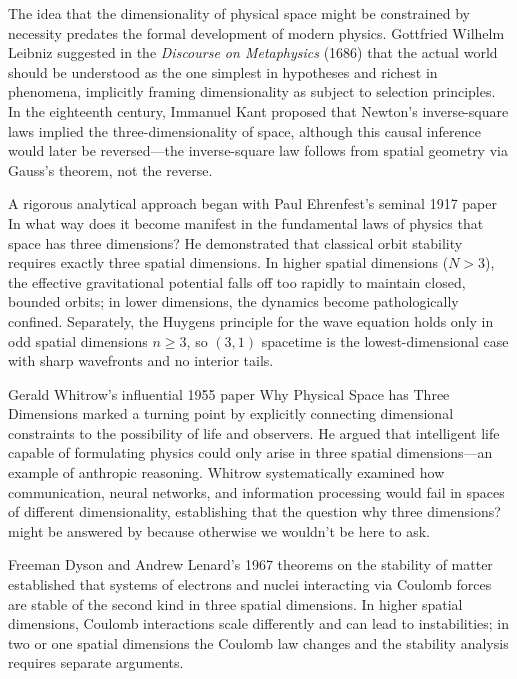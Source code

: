 \begin{historical}
    The idea that the dimensionality of physical space might be constrained by necessity predates the formal development of modern physics. Gottfried Wilhelm Leibniz suggested in the \emph{Discourse on Metaphysics} (1686) that the actual world should be understood as the one \QSOpen{}simplest in hypotheses and richest in phenomena,\QSClose{} implicitly framing dimensionality as subject to selection principles. In the eighteenth century, Immanuel Kant proposed that Newton's inverse-square laws implied the three-dimensionality of space, although this causal inference would later be reversed—the inverse-square law follows from spatial geometry via Gauss's theorem, not the reverse.
    
    A rigorous analytical approach began with Paul Ehrenfest's seminal 1917 paper \QSOpen{}In what way does it become manifest in the fundamental laws of physics that space has three dimensions?\QSClose{} He demonstrated that classical orbit stability requires exactly three spatial dimensions. In higher spatial dimensions ($N > 3$), the effective gravitational potential falls off too rapidly to maintain closed, bounded orbits; in lower dimensions, the dynamics become pathologically confined. Separately, the Huygens principle for the wave equation holds only in odd spatial dimensions $n \ge 3$, so $(3,1)$ spacetime is the lowest-dimensional case with sharp wavefronts and no interior tails.
    
    Gerald Whitrow's influential 1955 paper \QSOpen{}Why Physical Space has Three Dimensions\QSClose{} marked a turning point by explicitly connecting dimensional constraints to the possibility of life and observers. He argued that intelligent life capable of formulating physics could only arise in three spatial dimensions—an example of anthropic reasoning. Whitrow systematically examined how communication, neural networks, and information processing would fail in spaces of different dimensionality, establishing that the question \QSOpen{}why three dimensions?\QSClose{} might be answered by \QSOpen{}because otherwise we wouldn't be here to ask.\QSClose{}
    
    Freeman Dyson and Andrew Lenard's 1967 theorems on the stability of matter established that systems of electrons and nuclei interacting via Coulomb forces are stable of the second kind in three spatial dimensions. In higher spatial dimensions, Coulomb interactions scale differently and can lead to instabilities; in two or one spatial dimensions the Coulomb law changes and the stability analysis requires separate arguments.
    
    \end{historical}